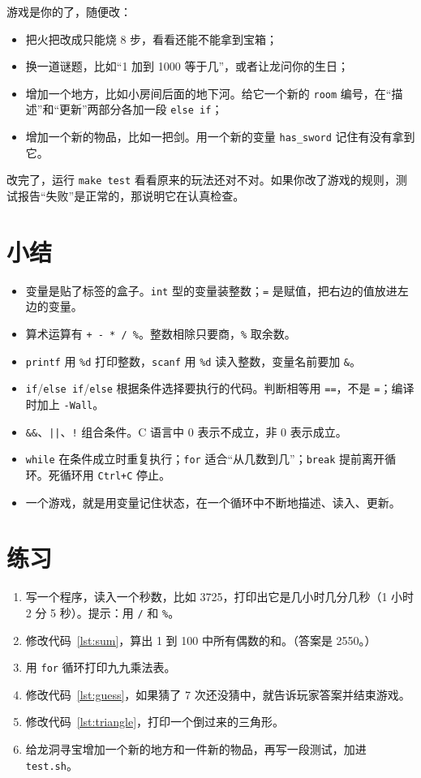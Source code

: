 游戏是你的了，随便改：
\begin{itemize}
  \item 把火把改成只能烧 8 步，看看还能不能拿到宝箱；
  \item 换一道谜题，比如“1 加到 1000 等于几”，或者让龙问你的生日；
  \item 增加一个地方，比如小房间后面的地下河。给它一个新的 \texttt{room} 编号，在“描述”和“更新”两部分各加一段 \texttt{else if}；
  \item 增加一个新的物品，比如一把剑。用一个新的变量 \texttt{has\_sword} 记住有没有拿到它。
\end{itemize}
改完了，运行 \texttt{make test} 看看原来的玩法还对不对。如果你改了游戏的规则，测试报告“失败”是正常的，那说明它在认真检查。

\section{小结}

\begin{itemize}
  \item 变量是贴了标签的盒子。\texttt{int} 型的变量装整数；\texttt{=} 是赋值，把右边的值放进左边的变量。
  \item 算术运算有 \texttt{+ - * / \%}。整数相除只要商，\texttt{\%} 取余数。
  \item \texttt{printf} 用 \texttt{\%d} 打印整数，\texttt{scanf} 用 \texttt{\%d} 读入整数，变量名前要加 \texttt{\&}。
  \item \texttt{if}/\texttt{else if}/\texttt{else} 根据条件选择要执行的代码。判断相等用 \texttt{==}，不是 \texttt{=}；编译时加上 \texttt{-Wall}。
  \item \texttt{\&\&}、\texttt{||}、\texttt{!} 组合条件。C 语言中 0 表示不成立，非 0 表示成立。
  \item \texttt{while} 在条件成立时重复执行；\texttt{for} 适合“从几数到几”；\texttt{break} 提前离开循环。死循环用 \texttt{Ctrl+C} 停止。
  \item 一个游戏，就是用变量记住状态，在一个循环中不断地描述、读入、更新。
\end{itemize}

\section*{练习}

\begin{enumerate}
  \item 写一个程序，读入一个秒数，比如 3725，打印出它是几小时几分几秒（1 小时 2 分 5 秒）。提示：用 \texttt{/} 和 \texttt{\%}。
  \item 修改代码~\ref{lst:sum}，算出 1 到 100 中所有偶数的和。（答案是 2550。）
  \item 用 \texttt{for} 循环打印九九乘法表。
  \item 修改代码~\ref{lst:guess}，如果猜了 7 次还没猜中，就告诉玩家答案并结束游戏。
  \item 修改代码~\ref{lst:triangle}，打印一个倒过来的三角形。
  \item 给龙洞寻宝增加一个新的地方和一件新的物品，再写一段测试，加进 \texttt{test.sh}。
\end{enumerate}
